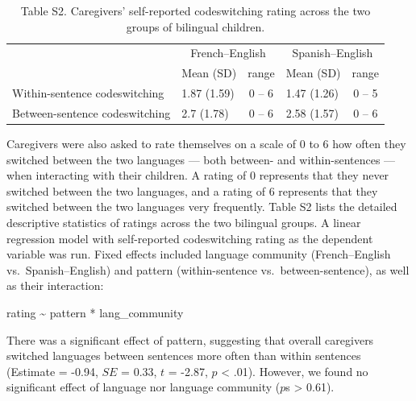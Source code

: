 \documentclass[
  man,floatsintext]{apa7}
\begin{document}
\begin{table}[H]

\begin{center}
\begin{threeparttable}

\caption{\label{tab:unnamed-chunk-8}Table S2. Caregivers’ self-reported codeswitching rating across the two groups of bilingual children.}

\begin{tabular}{m{6cm}m{2.5cm}cm{2.5cm}c}
\toprule
 & \multicolumn{2}{c}{French–English} & \multicolumn{2}{c}{Spanish–English} \\
\cmidrule(r){2-3} \cmidrule(r){4-5}
  & \multicolumn{1}{c}{Mean (SD)} & \multicolumn{1}{c}{range} & \multicolumn{1}{c}{Mean (SD)} & \multicolumn{1}{c}{range}\\
\midrule
Within-sentence codeswitching & 1.87 (1.59) & 0 – 6 & 1.47 (1.26) & 0 – 5\\
Between-sentence codeswitching & 2.7 (1.78) & 0 – 6 & 2.58 (1.57) & 0 – 6\\
\bottomrule
\end{tabular}

\end{threeparttable}
\end{center}

\end{table}

Caregivers were also asked to rate themselves on a scale of 0 to 6 how often they switched between the two languages --- both between- and within-sentences --- when interacting with their children. A rating of 0 represents that they never switched between the two languages, and a rating of 6 represents that they switched between the two languages very frequently. Table S2 lists the detailed descriptive statistics of ratings across the two bilingual groups. A linear regression model with self-reported codeswitching rating as the dependent variable was run. Fixed effects included language community (French--English vs.~Spanish--English) and pattern (within-sentence vs.~between-sentence), as well as their interaction:

rating \textasciitilde{} pattern * lang\_community

\noindent There was a significant effect of pattern, suggesting that overall caregivers switched languages between sentences more often than within sentences (Estimate = -0.94, \(SE\) = 0.33, \(t\) = -2.87, \(p\) \textless{} .01). However, we found no significant effect of language nor language community (\(p\)s \textgreater{} 0.61).
\end{document}
